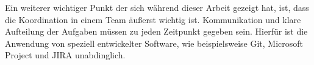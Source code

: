 Ein weiterer wichtiger Punkt der sich während dieser Arbeit gezeigt hat, ist, dass die Koordination in einem Team äußerst wichtig ist. Kommunikation und klare Aufteilung der Aufgaben müssen zu jeden Zeitpunkt gegeben sein. Hierfür ist die Anwendung von speziell entwickelter Software, wie beispielsweise Git, Microsoft Project und JIRA unabdinglich.
